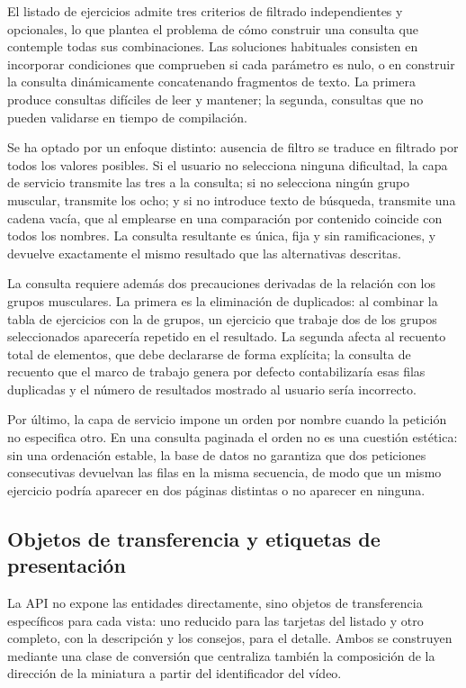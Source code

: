 \documentclass[12pt,a4paper,twoside,openright]{book}
\begin{document}
    El listado de ejercicios admite tres criterios de filtrado independientes y
    opcionales, lo que plantea el problema de cómo construir una consulta que
    contemple todas sus combinaciones. Las soluciones habituales consisten en
    incorporar condiciones que comprueben si cada parámetro es nulo, o en
    construir la consulta dinámicamente concatenando fragmentos de texto. La
    primera produce consultas difíciles de leer y mantener; la segunda,
    consultas que no pueden validarse en tiempo de compilación.

    Se ha optado por un enfoque distinto: ausencia de filtro se traduce en
    filtrado por todos los valores posibles. Si el usuario no selecciona
    ninguna dificultad, la capa de servicio transmite las tres a la consulta;
    si no selecciona ningún grupo muscular, transmite los ocho; y si no
    introduce texto de búsqueda, transmite una cadena vacía, que al emplearse
    en una comparación por contenido coincide con todos los nombres. La
    consulta resultante es única, fija y sin ramificaciones, y devuelve
    exactamente el mismo resultado que las alternativas descritas.

    La consulta requiere además dos precauciones derivadas de la relación con
    los grupos musculares. La primera es la eliminación de duplicados: al
    combinar la tabla de ejercicios con la de grupos, un ejercicio que trabaje
    dos de los grupos seleccionados aparecería repetido en el resultado. La
    segunda afecta al recuento total de elementos, que debe declararse de forma
    explícita; la consulta de recuento que el marco de trabajo genera por
    defecto contabilizaría esas filas duplicadas y el número de resultados
    mostrado al usuario sería incorrecto.

    Por último, la capa de servicio impone un orden por nombre cuando la
    petición no especifica otro. En una consulta paginada el orden no es una
    cuestión estética: sin una ordenación estable, la base de datos no
    garantiza que dos peticiones consecutivas devuelvan las filas en la misma
    secuencia, de modo que un mismo ejercicio podría aparecer en dos páginas
    distintas o no aparecer en ninguna.

    \subsection{Objetos de transferencia y etiquetas de presentación}

    La API no expone las entidades directamente, sino objetos de transferencia
    específicos para cada vista: uno reducido para las tarjetas del listado y
    otro completo, con la descripción y los consejos, para el detalle. Ambos se
    construyen mediante una clase de conversión que centraliza también la
    composición de la dirección de la miniatura a partir del identificador del
    vídeo.
\end{document}
